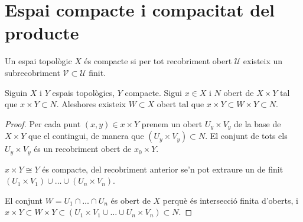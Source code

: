 \section{Espai compacte i compacitat del producte}

\begin{defi}
    Un espai topològic $X$ és compacte si per tot recobriment obert $\mathcal{U}$ existeix un subrecobriment $\mathcal{V}\subset\mathcal{U}$ finit.
\end{defi}

\begin{lema}
    Siguin $X$ i $Y$ espais topològics, $Y$ compacte. Sigui $x\in X$ i $N$ obert de $X \times Y$ tal que $x\times Y \subset N$.
    Aleshores existeix $W \subset X$ obert tal que $x\times Y \subset W \times Y \subset N$.
\end{lema}
\begin{proof}
    Per cada punt $(x,y) \in x\times Y$ prenem un obert $U_y\times V_y$ de la base de $X\times Y$ que el contingui, de manera que $(U_y\times V_y) \subset N$. El conjunt de tots els $U_y\times V_y$ és un recobriment obert de $x_0\times Y$.
    
    $x \times Y \cong Y$ és compacte, del recobriment anterior se'n pot extraure un de finit $(U_1 \times V_1) \cup\dots\cup (U_n \times V_n)$.
    
    El conjunt $W = U_1 \cap\dots\cap U_n$ és obert de $X$ perquè és intersecció finita d'oberts, i $x \times Y \subset W\times Y \subset (U_1 \times V_1 \cup\dots\cup U_n \times V_n) \subset N$.
\end{proof}

